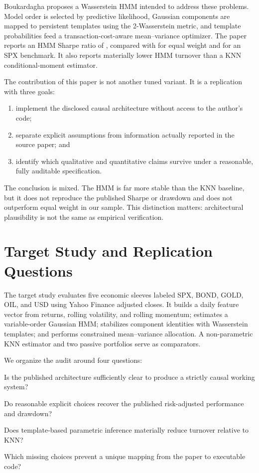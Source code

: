 \documentclass[11pt]{article}
\begin{document}
Boukardagha \cite{boukardagha2026} proposes a Wasserstein HMM intended to address these problems. Model order is selected by predictive likelihood, Gaussian components are mapped to persistent templates using the 2-Wasserstein metric, and template probabilities feed a transaction-cost-aware mean--variance optimizer. The paper reports an HMM Sharpe ratio of \PubHMMSharpe{}, compared with \PubEqualSharpe{} for equal weight and \PubSPXSharpe{} for an SPX benchmark. It also reports materially lower HMM turnover than a KNN conditional-moment estimator.

The contribution of this paper is not another tuned variant. It is a replication with three goals:

\begin{enumerate}
  \item implement the disclosed causal architecture without access to the author's code;
  \item separate explicit assumptions from information actually reported in the source paper; and
  \item identify which qualitative and quantitative claims survive under a reasonable, fully auditable specification.
\end{enumerate}

The conclusion is mixed. The HMM is far more stable than the KNN baseline, but it does not reproduce the published Sharpe or drawdown and does not outperform equal weight in our sample. This distinction matters: architectural plausibility is not the same as empirical verification.

\section{Target Study and Replication Questions}

The target study evaluates five economic sleeves labeled SPX, BOND, GOLD, OIL, and USD using Yahoo Finance adjusted closes. It builds a daily feature vector from returns, rolling volatility, and rolling momentum; estimates a variable-order Gaussian HMM; stabilizes component identities with Wasserstein templates; and performs constrained mean--variance allocation. A non-parametric KNN estimator and two passive portfolios serve as comparators.

We organize the audit around four questions:

\begin{description}[style=nextline]
  \item[RQ1: Implementability.] Is the published architecture sufficiently clear to produce a strictly causal working system?
  \item[RQ2: Numerical reproducibility.] Do reasonable explicit choices recover the published risk-adjusted performance and drawdown?
  \item[RQ3: Stability.] Does template-based parametric inference materially reduce turnover relative to KNN?
  \item[RQ4: Identification.] Which missing choices prevent a unique mapping from the paper to executable code?
\end{description}
\end{document}
